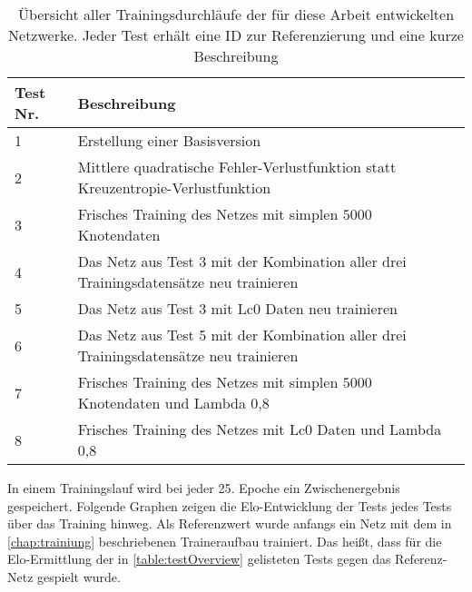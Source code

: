 \begin{table}[ht]
  \caption{Übersicht aller Trainingsdurchläufe der für diese Arbeit entwickelten Netzwerke. Jeder Test erhält eine ID zur Referenzierung und eine kurze Beschreibung}
  \label{table:testOverview}
  \renewcommand{\arraystretch}{1.2}
  \centering
  \sffamily
  \begin{footnotesize}
    \begin{tabular}{l l}
      \toprule
      \textbf{Test Nr.} & \textbf{Beschreibung}                                                                 \\
      \midrule
      1                 & Erstellung einer Basisversion                                                        \\
      2                 & Mittlere quadratische Fehler-Verlustfunktion statt Kreuzentropie-Verlustfunktion      \\
      3                 & Frisches Training des Netzes mit simplen $5000$ Knotendaten                          \\
      4                 & Das Netz aus Test 3 mit der Kombination aller drei Trainingsdatensätze neu trainieren \\
      5                 & Das Netz aus Test 3 mit \ac{Lc0} Daten neu trainieren                                 \\
      6                 & Das Netz aus Test 5 mit der Kombination aller drei Trainingsdatensätze neu trainieren \\
      7                 & Frisches Training des Netzes mit simplen $5000$ Knotendaten und Lambda 0,8           \\
      8                 & Frisches Training des Netzes mit \ac{Lc0} Daten und Lambda 0,8                  \\
      \bottomrule
    \end{tabular}
  \end{footnotesize}
  \rmfamily
\end{table}


In einem Trainingslauf wird bei jeder 25. Epoche ein Zwischenergebnis gespeichert. Folgende Graphen zeigen die Elo-Entwicklung der Tests jedes Tests über das Training hinweg. Als Referenzwert wurde anfangs ein Netz mit dem in \autoref{chap:trainiung} beschriebenen Traineraufbau trainiert. Das heißt, dass für die Elo-Ermittlung der in \autoref{table:testOverview} gelisteten Tests gegen das Referenz-Netz gespielt wurde.

